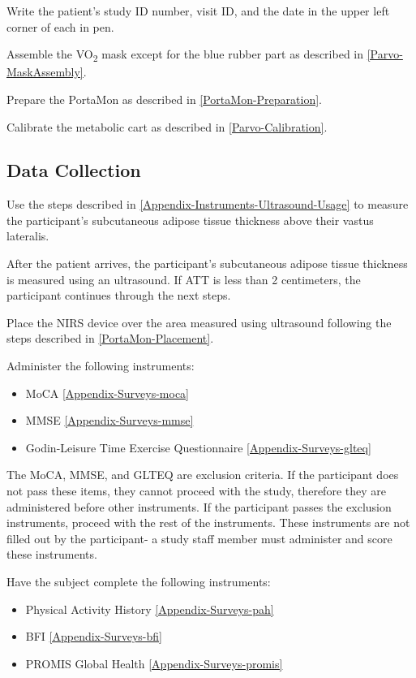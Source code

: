 \documentclass[
]{book}
\providecommand{\tightlist}{%
  \setlength{\itemsep}{0pt}\setlength{\parskip}{0pt}}
\begin{document}
Write the patient's study ID number, visit ID, and the date in the upper left corner of each in pen.

Assemble the VO\textsubscript{2} mask except for the blue rubber part as described in \ref{Parvo-MaskAssembly}.

Prepare the PortaMon as described in \ref{PortaMon-Preparation}.

Calibrate the metabolic cart as described in \ref{Parvo-Calibration}.

\hypertarget{Methods-LT-DataCollection}{%
\subsection{Data Collection}\label{Methods-LT-DataCollection}}

Use the steps described in \ref{Appendix-Instruments-Ultrasound-Usage} to measure the participant's subcutaneous adipose tissue thickness above their vastus lateralis.

After the patient arrives, the participant's subcutaneous adipose tissue thickness is measured using an ultrasound. If ATT is less than 2 centimeters, the participant continues through the next steps.

Place the NIRS device over the area measured using ultrasound following the steps described in \ref{PortaMon-Placement}.

Administer the following instruments:

\begin{itemize}
\tightlist
\item
  MoCA \ref{Appendix-Surveys-moca}
\item
  MMSE \ref{Appendix-Surveys-mmse}
\item
  Godin-Leisure Time Exercise Questionnaire \ref{Appendix-Surveys-glteq}
\end{itemize}

The MoCA, MMSE, and GLTEQ are exclusion criteria. If the participant does not pass these items, they cannot proceed with the study, therefore they are administered before other instruments. If the participant passes the exclusion instruments, proceed with the rest of the instruments. These instruments are not filled out by the participant- a study staff member must administer and score these instruments.

Have the subject complete the following instruments:

\begin{itemize}
\tightlist
\item
  Physical Activity History \ref{Appendix-Surveys-pah}
\item
  BFI \ref{Appendix-Surveys-bfi}
\item
  PROMIS Global Health \ref{Appendix-Surveys-promis}
\end{itemize}
\end{document}

